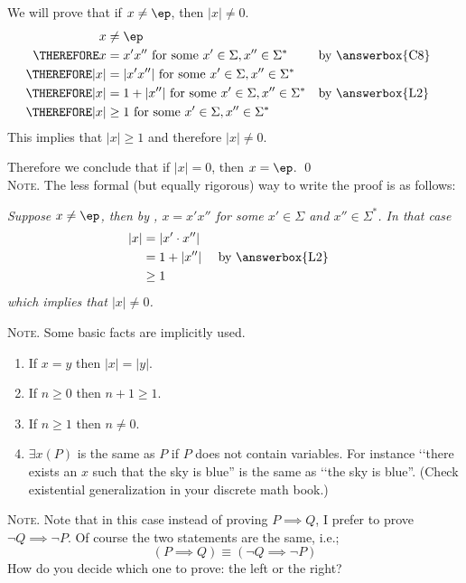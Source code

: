 We will prove that if $x \neq \ep$, then $|x| \neq 0$.
\begin{align*}
x &\neq \ep \\
\THEREFORE x &= x'x'' \text{ for some } x' \in \Sigma, x'' \in \Sigma^*
           & & \text{by \answerbox{C8}} \\
\THEREFORE |x| &= |x' x''| \text{ for some } x' \in \Sigma, x'' \in \Sigma^* 
           \\ 
\THEREFORE |x| &= 1 + |x''| \text{ for some } x' \in \Sigma, x'' \in \Sigma^*
           & & \text{by \answerbox{L2}} \\
\THEREFORE |x| &\geq 1 \text{ for some } x' \in \Sigma, x'' \in \Sigma^* 
\end{align*}
This implies that $|x| \geq 1$ and therefore $|x| \neq 0$.

Therefore we conclude that if $|x| = 0$, then $x = \ep$. \qed
\\

\textsc{Note.}
The less formal (but equally rigorous) way to write the proof is as follows:

\textit{
Suppose $x \neq \ep$, then by , $x = x'x''$ 
for some $x' \in \Sigma$ and $x'' \in \Sigma^*$.
In that case
\begin{align*}
|x| 
&= |x' \cdot x''| \\ 
&= 1 + |x''| & & \text{ by \answerbox{L2}}    \\
&\geq 1
\end{align*}
which implies that $|x| \neq 0$.
}

\textsc{Note.}
Some basic facts are implicitly used.
\begin{enumerate}
\item If $x = y$ then $|x|= |y|$. 
\item If $n \geq 0$ then $n + 1 \geq 1$.
\item If $n \geq 1$ then $ n \neq 0$.
\item $\exists x(P)$ is the same as $P$ if
$P$ does not contain variables.
For instance \lq\lq there exists an $x$ such that
the sky is blue'' is the same as
\lq\lq the sky is blue''.
(Check existential generalization in your discrete math book.)
\end{enumerate}

\textsc{Note.}
Note that in this case instead of proving $P \implies Q$,
I prefer to prove $\lnot Q \implies \lnot P$.
Of course the two statements are the same, i.e.;
\[
(P \implies Q) \equiv (\lnot Q \implies \lnot P)
\]
How do you decide which one to prove: the left or the right?

